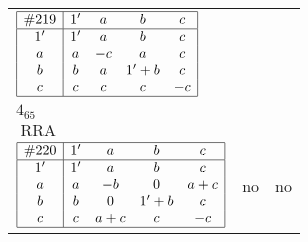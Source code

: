 \documentclass[12pt]{article}
\theoremstyle{definition}
\newcommand\RRA{\operatorname{RRA}}
\newcommand{\join}{\mathbin{+}}%
\newcommand{\id}{{1'}}%
\begin{document}
\begin{center}
\begin{longtable}{l|c|c}
$
\begin{array}{|c|cccc|} \hline
\#219 & \id & a & b & c \\ \hline
\id & \id & a & b & c \\
a & a & -c & a & c \\
b & b & a & \id \join b & c \\
c & c & c & c & -c \\ \hline
\end{array}
$
 & \begin{tabular}{c} yes \\ $4_{65}$ \\ $\RRA$ \end{tabular} 
 & \adjustbox{valign=c, max height=1.6cm}{$
\left[ \begin{array}{cccccc}
\id & a & a & b & c & b \\ 
a & \id & a & a & c & a \\ 
a & a & \id & a & c & a \\ 
b & a & a & \id & c & b \\ 
c & c & c & c & \id & c \\ 
b & a & a & b & c & \id
\end{array}\right]
$}      \\[15mm]

$
\begin{array}{|c|cccc|} \hline
\#220 & \id & a & b & c \\ \hline
\id & \id & a & b & c \\
a & a & -b & 0 & a \join c \\
b & b & 0 & \id \join b & c \\
c & c & a \join c & c & -c \\ \hline
\end{array}
$
 & no  
 & no     \\[15mm]


\end{longtable}
\end{center}
\end{document}
